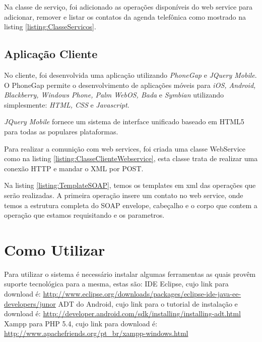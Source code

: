 \documentclass{acm_proc_article-sp}
\begin{document}
	
	
	Na classe de serviço, foi adicionado as operações disponíveis do web service para adicionar, remover e listar os contatos da agenda telefônica como mostrado na listing \ref{listing:ClasseServicos}.
	
	
	
	\subsection{Aplicação Cliente}
	
	No cliente, foi desenvolvida uma aplicação utilizando \emph{PhoneGap} e \emph{JQuery Mobile}. O PhoneGap permite o desenvolvimento de aplicações móveis para \emph{iOS, Android, Blackberry, Windows Phone, Palm WebOS, Bada} e \emph{Symbian} utilizando simplesmente: \emph{HTML, CSS} e \emph{Javascript}.\cite{PHONEGAPSITE}
	
	\emph{JQuery Mobile} fornece um sistema de interface unificado baseado em HTML5 para todas as populares plataformas.\cite{JQUERYMOBILESITE}
	
	Para realizar a comunição com web services, foi criada uma classe WebService como na listing \ref{listing:ClasseClienteWebservice}, esta classe trata de realizar uma conexão HTTP e mandar o XML por POST.
	
	
	
	Na listing \ref{listing:TemplateSOAP}, temos os templates em xml das operações que serão realizadas. A primeira operação insere um contato no web service, onde temos a estrutura completa do SOAP envelope, cabeçalho e o corpo que contem a operação que estamos requisitando e os parametros.
	
	
 
\section{Como Utilizar}
	
	Para utilizar o sistema é necessário instalar algumas ferramentas as quais provêm suporte tecnológica para a mesma, estas são:
	IDE Eclipse, cujo link para download é: \url{http://www.eclipse.org/downloads/packages/eclipse-ide-java-ee-developers/junor}
	ADT do Android, cujo link para o tutorial de instalação e download é: \url{http://developer.android.com/sdk/installing/installing-adt.html}
	Xampp para PHP 5.4, cujo link para download é: \url{ http://www.apachefriends.org/pt_br/xampp-windows.html}
	
\end{document}
